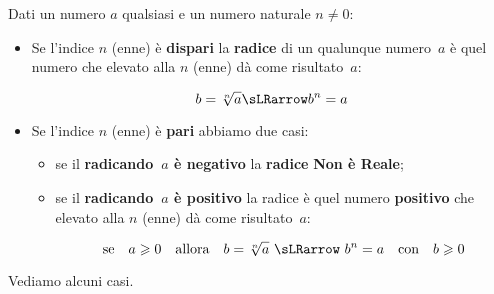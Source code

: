 \begin{definizione}{}{}
Dati un numero \(a\) qualsiasi e un numero naturale \(n \neq 0\):

\begin{itemize}
\item Se l'indice \(n\) (enne) è \textbf{dispari} la \textbf{radice} di 
un qualunque numero~\(a\) è quel numero che elevato alla \(n\) (enne) dà 
come risultato~\(a\):

\vspace{-1.5em}
\[b=\sqrt[n]{a} \sLRarrow b^n=a\]
\item Se l'indice \(n\) (enne) è \textbf{pari} abbiamo due casi:
\begin{itemize} [nosep]
  \item se il \textbf{radicando~\(a\) è negativo} la \textbf{radice} 
          \textbf{Non è Reale};
  \item se il \textbf{radicando~\(a\) è positivo} la radice è quel numero 
\textbf{positivo} che elevato alla \(n\) (enne) dà come risultato~\(a\):

\vspace{-2em}
\[\text{se} \quad a \geqslant 0 \quad \text{allora} \quad 
  b=\sqrt[n]{a} ~\sLRarrow ~ b^n=a \quad \text{con} \quad b \geqslant 0\]
\end{itemize}
\end{itemize}
\end{definizione}

\bigskip
Vediamo alcuni casi.

